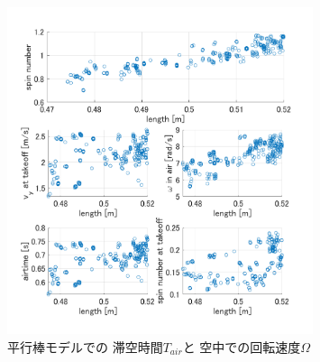 \documentclass[a4paper,11pt]{jsarticle}
\begin{document}
\begin{figure}[h]
  \centering
  \includegraphics[width = 0.8\textwidth]{Tari_Omega_PB.png}
  \caption{
    平行棒モデルでの
    滞空時間$T_{air}$と
    空中での回転速度$\Omega$
  }
  \label{Tari_Omega_PB.png}
\end{figure}
\end{document}
